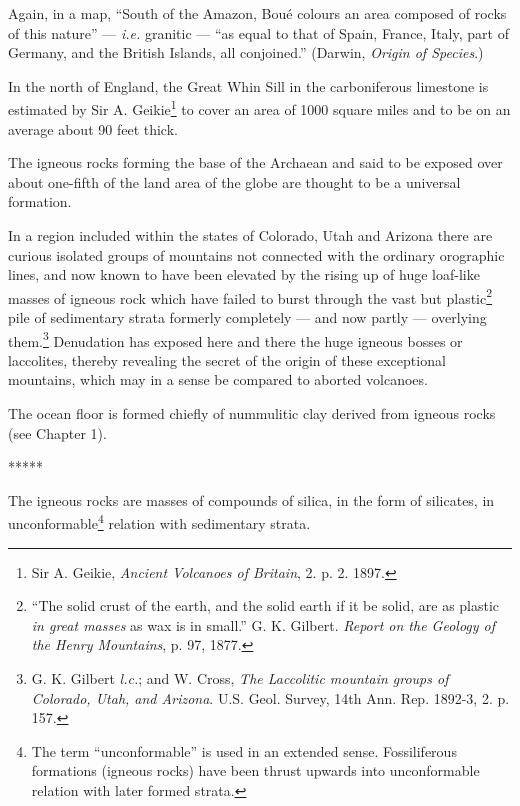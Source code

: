 \documentclass[a4paper, 12pt, oneside]{article}
\begin{document}
Again, in a map, ``South of the Amazon, Boué colours an area composed of rocks of this nature'' --- \emph{i.e.} granitic --- ``as equal to that of Spain, France, Italy, part of Germany, and the British Islands, all conjoined.'' (Darwin, \emph{Origin of Species}.)

In the north of England, the Great Whin Sill in the carboniferous limestone is estimated by Sir A. Geikie\footnote{Sir A. Geikie, \emph{Ancient Volcanoes of Britain}, 2. p. 2. 1897.} to cover an area of 1000 square miles and to be on an average about 90 feet thick.

The igneous rocks forming the base of the Archaean and said to be exposed over about one-fifth of the land area of the globe are thought to be a universal formation.

In a region included within the states of Colorado, Utah and Arizona there are curious isolated groups of mountains not connected with the ordinary orographic lines, and now known to have been elevated by the rising up of huge loaf-like masses of igneous rock which have failed to burst through the vast but plastic\footnote{``The solid crust of the earth, and the solid earth if it be solid, are as plastic \emph{in great masses} as wax is in small.'' G. K. Gilbert. \emph{Report on the Geology of the Henry Mountains}, p. 97, 1877.} pile of sedimentary strata formerly completely --- and now partly --- overlying them.\footnote{G. K. Gilbert \emph{l.c.}; and W. Cross, \emph{The Laccolitic mountain groups of Colorado, Utah, and Arizona}. U.S. Geol. Survey, 14th Ann. Rep. 1892-3, 2. p. 157.} Denudation has exposed here and there the huge igneous bosses or laccolites, thereby revealing the secret of the origin of these exceptional mountains, which may in a sense be compared to aborted volcanoes.

The ocean floor is formed chiefly of nummulitic clay derived from igneous rocks (see Chapter 1).

\centerline{*\hspace{15mm}*\hspace{15mm}*\hspace{15mm}*\hspace{15mm}*}
\bigskip

The igneous rocks are masses of compounds of silica, in the form of silicates, in unconformable\footnote{The term ``unconformable'' is used in an extended sense. Fossiliferous formations (igneous rocks) have been thrust upwards into unconformable relation with later formed strata.} relation with sedimentary strata.
\end{document}
